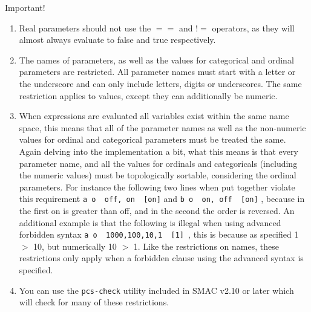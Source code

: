 \documentclass[manual.tex]{subfiles}
\begin{document}
\begin{bclogo}[logo=\bcattention, couleurBarre=red, noborder=true]{Important!}
\begin{enumerate}
\item Real parameters should not use the $==$ and $!=$ operators, as they will almost always evaluate to false and true respectively.

\item The names of parameters, as well as the values for categorical and ordinal parameters are restricted. All parameter names must start with a letter or the underscore and can only include letters, digits or underscores. The same restriction applies to values, except they can additionally be numeric.

\item When expressions are evaluated all variables exist within the same name space, this means that all of the parameter names as well as the non-numeric values for ordinal and categorical parameters must be treated the same. Again delving into the implementation a bit, what this means is that every parameter name, and all the values for ordinals and categoricals (including the numeric values) must be topologically sortable, considering the ordinal parameters. For instance the following two lines when put together violate this requirement \texttt{a o { off, on } [on]} and \texttt{b o { on, off } [on]} , because in the first on is greater than off, and in the second the order is reversed. An additional example is that the following is illegal when using advanced forbidden syntax \texttt{a o { 1000,100,10,1 } [1] }, this is because as specified 1 $>$ 10, but numerically 10 $>$ 1. Like the restrictions on names, these restrictions only apply when a forbidden clause using the advanced syntax is specified.

\item You can use the \texttt{pcs-check} utility included in SMAC v2.10 or later which will check for many of these restrictions.
\end{enumerate}

\end{bclogo}
\end{document}
